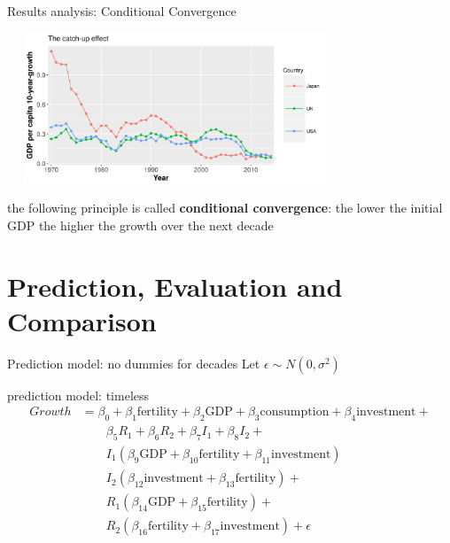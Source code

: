 \documentclass[9pt]{beamer}
\begin{document}
\begin{frame}{Results analysis: Conditional Convergence}
	
	\begin{block}{}
		\includegraphics[height=4.5cm,width=10cm]{convergence.png}
	\end{block}
	\begin{definition}
		the following principle is called \textbf{conditional convergence}: the lower the initial GDP the higher the growth over the next decade
	\end{definition}
			
\end{frame}


\section{Prediction, Evaluation and Comparison}

\begin{frame}{Prediction model: no dummies for decades}
	Let $ \epsilon \sim N(0,\sigma^2)$
	\begin{block}{prediction model: timeless}
		\begin{align*}
		Growth &= \beta_0+\beta_1\text{fertility}+\beta_2\text{GDP}+\beta_3\text{consumption}+\beta_4\text{investment}+\\
		& \qquad 
		\beta_5R_1+\beta_{6}R_2+\beta_{7}I_1+\beta_{8}I_2+\\
		& \qquad
        I_1(\beta_{9}\text{GDP}+\beta_{10}\text{fertility}+\beta_{11}\text{investment})\\
		& \qquad 
		I_2(\beta_{12}\text{investment} + \beta_{13}\text{fertility}) +\\
		&\qquad R_1(\beta_{14}\text{GDP}+\beta_{15}\text{fertility})+\\
		&\qquad
		R_2(\beta_{16}\text{fertility}+\beta_{17}\text{investment}) + \epsilon \end{align*}
	\end{block}
\end{frame}
\end{document}
